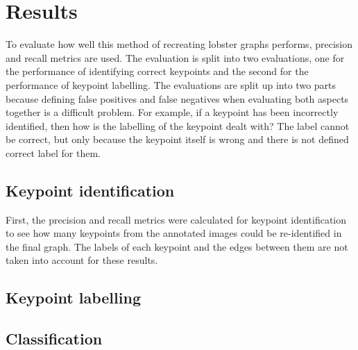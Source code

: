 \section{Results}\label{sec:results}
\newcommand{\resultspath}{tex/results}
To evaluate how well this method of recreating lobster graphs performs, precision and recall metrics are used. The evaluation is split into two evaluations, one for the performance of identifying correct keypoints and the second for the performance of keypoint labelling. The evaluations are split up into two parts because defining false positives and false negatives when evaluating both aspects together is a difficult problem. For example, if a keypoint has been incorrectly identified, then how is the labelling of the keypoint dealt with? The label cannot be correct, but only because the keypoint itself is wrong and there is not defined correct label for them. 

\subsection{Keypoint identification}
First, the precision and recall metrics were calculated for keypoint identification to see how many keypoints from the annotated images could be re-identified in the final graph. The labels of each keypoint and the edges between them are not taken into account for these results. 

\begin{figure}[H]
\centering
{}

\end{figure}

\subsection{Keypoint labelling}

\subsection{Classification}


